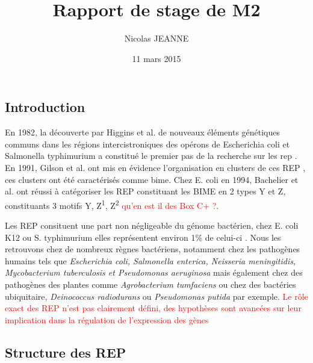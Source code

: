 \documentclass[12pt,a4paper]{report}
\author{Nicolas JEANNE}
\title{Rapport de stage de M2}
\date{11 mars 2015}
\begin{document}
\maketitle

\begin{doublespace}
\chapter*{Introduction}

En 1982, la découverte par Higgins et al. de nouveaux éléments génétiques communs dans les régions intercistroniques des opérons de Escherichia coli et Salmonella typhimurium a constitué le premier pas de la recherche sur les \gls{rep} \citep{Higgins1982}. En 1991, Gilson et al. ont mis en évidence l'organisation en clusters de ces REP \citep{Gilson1991}, ces clusters ont été caractérisés comme \gls{bime}. Chez E. coli en 1994, Bachelier et al. ont réussi à catégoriser les REP constituant les BIME en 2 types Y et Z, constituants 3 motifs Y, Z\textsuperscript{1}, Z\textsuperscript{2} \textcolor{red}{qu'en est il des Box C+ ?}\citep{Bachellier1994}.
 
Les REP consituent une part non négligeable du génome bactérien, chez E. coli K12 ou S. typhimurium elles représentent environ 1\% de celui-ci \citep{Gilson1991}. Nous les retrouvons chez de nombreux règnes bactériens, notamment chez les pathogènes humains tels que \textit{Escherichia coli, Salmonella enterica, Neisseria meningitidis, Mycobacterium tuberculosis et Pseudomonas aeruginosa} mais également chez des pathogènes des plantes comme \textit{Agrobacterium tumfaciens} ou chez des bactéries ubiquitaire, \textit{Deinococcus radiodurans} ou \textit{Pseudomonas putida} par exemple. \textcolor{red}{Le rôle exact des REP n'est pas clairement défini, des hypothèses sont avancées sur leur implication dans la régulation de l'expression des gènes}

\section*{Structure des REP}


\end{doublespace} 
\printglossary[type=\acronymtype ,title=Glossaire]



\end{document}
